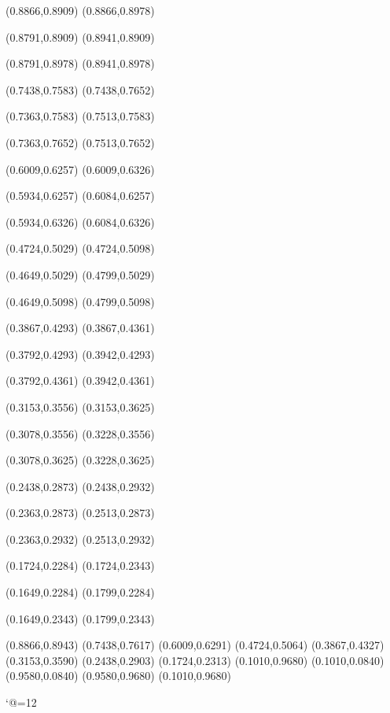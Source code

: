 \PST@Dashed(0.8866,0.8909)
(0.8866,0.8978)

\PST@Dashed(0.8791,0.8909)
(0.8941,0.8909)

\PST@Dashed(0.8791,0.8978)
(0.8941,0.8978)

\PST@Dashed(0.7438,0.7583)
(0.7438,0.7652)

\PST@Dashed(0.7363,0.7583)
(0.7513,0.7583)

\PST@Dashed(0.7363,0.7652)
(0.7513,0.7652)

\PST@Dashed(0.6009,0.6257)
(0.6009,0.6326)

\PST@Dashed(0.5934,0.6257)
(0.6084,0.6257)

\PST@Dashed(0.5934,0.6326)
(0.6084,0.6326)

\PST@Dashed(0.4724,0.5029)
(0.4724,0.5098)

\PST@Dashed(0.4649,0.5029)
(0.4799,0.5029)

\PST@Dashed(0.4649,0.5098)
(0.4799,0.5098)

\PST@Dashed(0.3867,0.4293)
(0.3867,0.4361)

\PST@Dashed(0.3792,0.4293)
(0.3942,0.4293)

\PST@Dashed(0.3792,0.4361)
(0.3942,0.4361)

\PST@Dashed(0.3153,0.3556)
(0.3153,0.3625)

\PST@Dashed(0.3078,0.3556)
(0.3228,0.3556)

\PST@Dashed(0.3078,0.3625)
(0.3228,0.3625)

\PST@Dashed(0.2438,0.2873)
(0.2438,0.2932)

\PST@Dashed(0.2363,0.2873)
(0.2513,0.2873)

\PST@Dashed(0.2363,0.2932)
(0.2513,0.2932)

\PST@Dashed(0.1724,0.2284)
(0.1724,0.2343)

\PST@Dashed(0.1649,0.2284)
(0.1799,0.2284)

\PST@Dashed(0.1649,0.2343)
(0.1799,0.2343)

\PST@Diamond(0.8866,0.8943)
\PST@Diamond(0.7438,0.7617)
\PST@Diamond(0.6009,0.6291)
\PST@Diamond(0.4724,0.5064)
\PST@Diamond(0.3867,0.4327)
\PST@Diamond(0.3153,0.3590)
\PST@Diamond(0.2438,0.2903)
\PST@Diamond(0.1724,0.2313)
\PST@Border(0.1010,0.9680)
(0.1010,0.0840)
(0.9580,0.0840)
(0.9580,0.9680)
(0.1010,0.9680)

\catcode`@=12
\fi
\endpspicture
